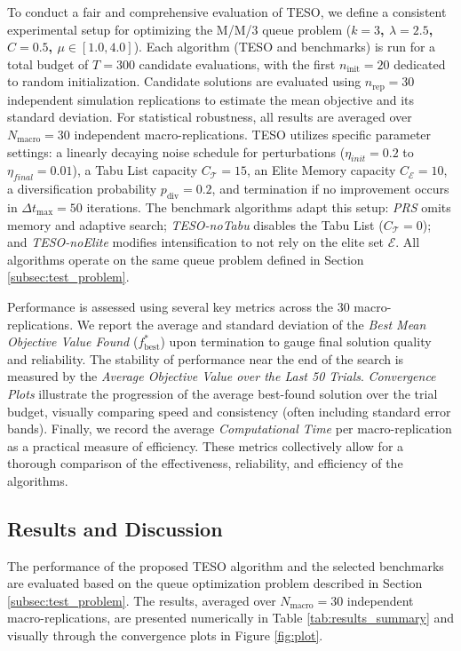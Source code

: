 \documentclass{article}
\begin{document}
To conduct a fair and comprehensive evaluation of TESO, we define a consistent experimental setup for optimizing the M/M/3 queue problem (\textbf{$k=3$, $\lambda=2.5$, $C=0.5$, $\mu \in [1.0, 4.0]$}). Each algorithm (TESO and benchmarks) is run for a total budget of $T=300$ candidate evaluations, with the first $n_{\text{init}}=20$ dedicated to random initialization. Candidate solutions are evaluated using $n_{\text{rep}}=30$ independent simulation replications to estimate the mean objective and its standard deviation. For statistical robustness, all results are averaged over $N_{\text{macro}}=30$ independent macro-replications. TESO utilizes specific parameter settings: a linearly decaying noise schedule for perturbations ($\eta_{init}=0.2$ to $\eta_{final}=0.01$), a Tabu List capacity $C_{\mathcal{T}}=15$, an Elite Memory capacity $C_{\mathcal{E}}=10$, a diversification probability $p_{\text{div}}=0.2$, and termination if no improvement occurs in $\Delta t_{\text{max}}=50$ iterations. The benchmark algorithms adapt this setup: \textit{PRS} omits memory and adaptive search; \textit{TESO-noTabu} disables the Tabu List ($C_{\mathcal{T}}=0$); and \textit{TESO-noElite} modifies intensification to not rely on the elite set $\mathcal{E}$. All algorithms operate on the same queue problem defined in Section \ref{subsec:test_problem}.

Performance is assessed using several key metrics across the 30 macro-replications. We report the average and standard deviation of the \textit{Best Mean Objective Value Found} ($f^*_{\text{best}}$) upon termination to gauge final solution quality and reliability. The stability of performance near the end of the search is measured by the \textit{Average Objective Value over the Last 50 Trials}. \textit{Convergence Plots} illustrate the progression of the average best-found solution over the trial budget, visually comparing speed and consistency (often including standard error bands). Finally, we record the average \textit{Computational Time} per macro-replication as a practical measure of efficiency. These metrics collectively allow for a thorough comparison of the effectiveness, reliability, and efficiency of the algorithms.

\subsection{Results and Discussion}
\label{subsec:results_discussion}

The performance of the proposed TESO algorithm and the selected benchmarks are evaluated based on the  queue optimization problem described in Section \ref{subsec:test_problem}. The results, averaged over $N_{\text{macro}}=30$ independent macro-replications, are presented numerically in Table \ref{tab:results_summary} and visually through the convergence plots in Figure \ref{fig:plot}.
\end{document}
